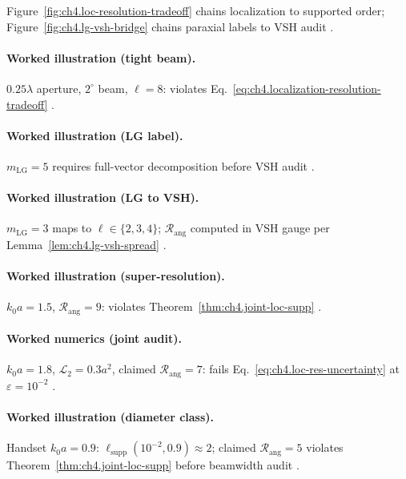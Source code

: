 Figure~\ref{fig:ch4.loc-resolution-tradeoff} chains localization to supported order; Figure~\ref{fig:ch4.lg-vsh-bridge} chains paraxial labels to
VSH audit \cite{harrington2001,hansen1988,stratton1941}.

\paragraph{Worked illustration (tight beam).}
\(0.25\lambda\) aperture, \(2^{\circ}\) beam, \(\ell=8\): violates Eq.~\eqref{eq:ch4.localization-resolution-tradeoff}
\cite{jackson1999,harrington2001,hansen1988,devaney2004}.

\paragraph{Worked illustration (LG label).}
\(m_{\mathrm{LG}}=5\) requires full-vector decomposition before VSH audit \cite{harrington2001,allen1992,hansen1988}.

\paragraph{Worked illustration (LG to VSH).}
\(m_{\mathrm{LG}}=3\) maps to \(\ell\in\{2,3,4\}\); \(\mathcal{R}_{\mathrm{ang}}\) computed in VSH gauge per Lemma~\ref{lem:ch4.lg-vsh-spread}
\cite{harrington2001,hansen1988,allen1992}.

\paragraph{Worked illustration (super-resolution).}
\(k_{0}a=1.5\), \(\mathcal{R}_{\mathrm{ang}}=9\): violates Theorem~\ref{thm:ch4.joint-loc-supp} \cite{hansen1988,jackson1999,harrington2001,stratton1941}.

\paragraph{Worked numerics (joint audit).}
\(k_{0}a=1.8\), \(\mathcal{L}_{2}=0.3a^{2}\), claimed \(\mathcal{R}_{\mathrm{ang}}=7\): fails Eq.~\eqref{eq:ch4.loc-res-uncertainty} at \(\varepsilon=10^{-2}\)
\cite{hansen1988,harrington2001,devaney2004}.

\paragraph{Worked illustration (diameter class).}
Handset \(k_{0}a=0.9\): \(\ell_{\mathrm{supp}}(10^{-2},0.9)\approx2\); claimed \(\mathcal{R}_{\mathrm{ang}}=5\) violates
Theorem~\ref{thm:ch4.joint-loc-supp} before beamwidth audit \cite{hansen1988,jackson1999,harrington2001,stratton1941,devaney2004}.

